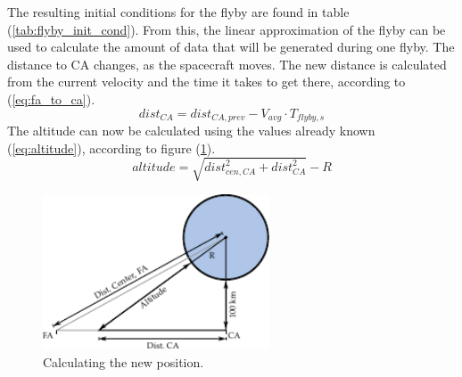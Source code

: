 The resulting initial conditions for the flyby are found in table (\ref{tab:flyby_init_cond}). From this, the linear approximation of the flyby can be used to calculate the amount of data that will be generated during one flyby. The distance to CA changes, as the spacecraft moves. The new distance is calculated from the current velocity and the time it takes to get there, according to (\ref{eq:fa_to_ca}).
\begin{equation}\label{eq:fa_to_ca}
dist_{CA} = dist_{CA,prev}-V_{avg}\cdot T_{flyby,s}
\end{equation}
The altitude can now be calculated using the values already known (\ref{eq:altitude}), according to figure (\ref{fig:linear_flyby_move}).
\begin{equation}\label{eq:altitude}
altitude = \sqrt{dist_{cen,CA}^2+dist_{CA}^2}-R
\end{equation}
\begin{figure}[htb!]
\centering
\includegraphics[width=0.6\textwidth]{figures/Orbiter/linear_flyby_move.pdf}
\caption{Calculating the new position.}
\label{fig:linear_flyby_move}
\end{figure}

